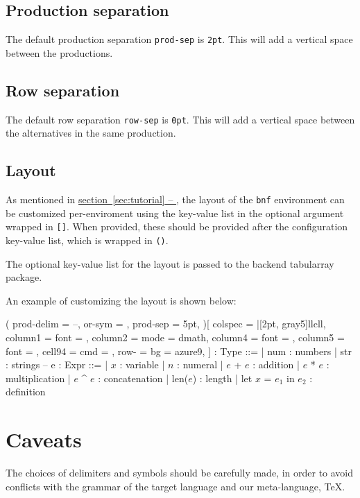 \documentclass[11pt]{article}
\newcommand*{\secref}[1]{\hyperref[{#1}]{section~\ref*{#1} -- \emph{\nameref*{#1}}}}
\begin{document}
\subsection{Production separation}
The default production separation \verb/prod-sep/ is \verb/2pt/.
This will add a vertical space between the productions.

\subsection{Row separation}
The default row separation \verb/row-sep/ is \verb/0pt/.
This will add a vertical space between the alternatives in the same production.

\subsection{Layout}\label{subsec:layout}
As mentioned in \secref{sec:tutorial}, the layout of the \verb/bnf/ environment can be customized per-enviroment using the key-value list in the optional argument wrapped in \verb/[]/.
When provided, these should be provided after the configuration key-value list, which is wrapped in \verb/()/.

The optional key-value list for the layout is passed to the backend \textsf{tabularray} package.

An example of customizing the layout is shown below:
\begin{example}[righthand width=.53\linewidth]
\begin{center}
\begin{bnf}(
  prod-delim = {--},
  or-sym = {},
  prod-sep = 5pt,
)[
  colspec = {|[2pt, gray5]llcll},
  column{1} = {font = \sffamily},
  column{2} = {mode = dmath},
  column{4} = {font = \ttfamily},
  column{5} = {font = \itshape},
  cell{9}{4} = {cmd = \fbox},
  row{-} = {bg = azure9},
]
  \tau : Type ::=
  | num : numbers
  | str : strings
  --
  e : Expr ::=
  | $x$ : variable
  | $n$ : numeral
  | $e$ + $e$ : addition
  | $e$ * $e$ : multiplication
  | $e$ \textasciicircum{} $e$ : concatenation
  | len($e$) : length
  | let $x$ = $e_1$ in $e_2$ : definition
\end{bnf}
\end{center}
\end{example}


\section{Caveats}
The choices of delimiters and symbols should be carefully made, in order to avoid conflicts with the grammar of the target language and our meta-language, \TeX{}.
\end{document}

